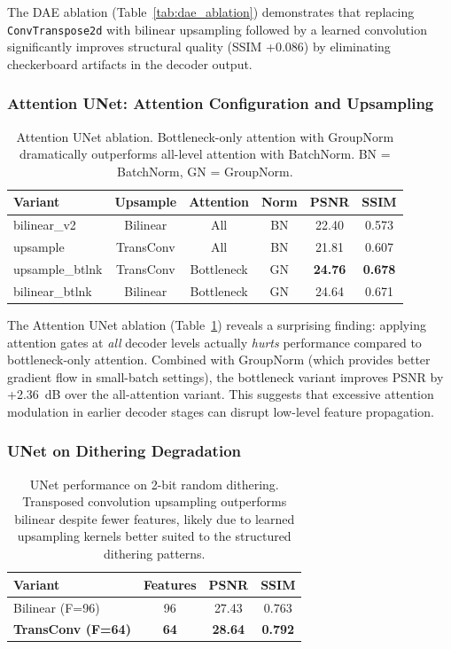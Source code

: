 The DAE ablation (Table~\ref{tab:dae_ablation}) demonstrates that replacing \texttt{ConvTranspose2d} with bilinear upsampling followed by a learned convolution significantly improves structural quality (SSIM +0.086) by eliminating checkerboard artifacts in the decoder output.

\subsubsection{Attention UNet: Attention Configuration and Upsampling}

\begin{table}[t]
\centering
\small
\setlength{\tabcolsep}{2.5pt}
\begin{tabular}{lccccc}
\toprule
\textbf{Variant} & \textbf{Upsample} & \textbf{Attention} & \textbf{Norm} & \textbf{PSNR} & \textbf{SSIM} \\
\midrule
bilinear\_v2 & Bilinear & All & BN & 22.40 & 0.573 \\
upsample & TransConv & All & BN & 21.81 & 0.607 \\
upsample\_btlnk & TransConv & Bottleneck & GN & \textbf{24.76} & \textbf{0.678} \\
bilinear\_btlnk & Bilinear & Bottleneck & GN & 24.64 & 0.671 \\
\bottomrule
\end{tabular}
\caption{Attention UNet ablation. Bottleneck-only attention with GroupNorm dramatically outperforms all-level attention with BatchNorm. BN = BatchNorm, GN = GroupNorm.}
\label{tab:attunet_ablation}
\end{table}

The Attention UNet ablation (Table~\ref{tab:attunet_ablation}) reveals a surprising finding: applying attention gates at \textit{all} decoder levels actually \textit{hurts} performance compared to bottleneck-only attention. Combined with GroupNorm (which provides better gradient flow in small-batch settings), the bottleneck variant improves PSNR by +2.36~dB over the all-attention variant. This suggests that excessive attention modulation in earlier decoder stages can disrupt low-level feature propagation.

\subsubsection{UNet on Dithering Degradation}

\begin{table}[t]
\centering
\small
\begin{tabular}{lccc}
\toprule
\textbf{Variant} & \textbf{Features} & \textbf{PSNR} & \textbf{SSIM} \\
\midrule
Bilinear (F=96) & 96 & 27.43 & 0.763 \\
\textbf{TransConv (F=64)} & \textbf{64} & \textbf{28.64} & \textbf{0.792} \\
\bottomrule
\end{tabular}
\caption{UNet performance on 2-bit random dithering. Transposed convolution upsampling outperforms bilinear despite fewer features, likely due to learned upsampling kernels better suited to the structured dithering patterns.}
\label{tab:unet_dithering}
\end{table}

